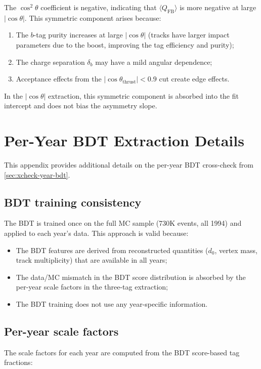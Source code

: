 \documentclass[11pt,a4paper]{article}
\begin{document}
The $\cos^2\theta$ coefficient is negative, indicating that
$\langle Q_\mathrm{FB} \rangle$ is more negative at large $|\cos\theta|$.
This symmetric component arises because:
\begin{enumerate}
\item The $b$-tag purity increases at large $|\cos\theta|$ (tracks have
  larger impact parameters due to the boost, improving the tag efficiency
  and purity);
\item The charge separation $\delta_b$ may have a mild angular dependence;
\item Acceptance effects from the $|\cos\theta_\mathrm{thrust}| < 0.9$
  cut create edge effects.
\end{enumerate}
In the $|\cos\theta|$ extraction, this symmetric component is absorbed
into the fit intercept and does not bias the asymmetry slope.

\section{Per-Year BDT Extraction Details}
\label{app:per-year-bdt}

This appendix provides additional details on the per-year BDT cross-check
from \cref{sec:xcheck-year-bdt}.

\subsection{BDT training consistency}

The BDT is trained once on the full MC sample (730K events, all 1994)
and applied to each year's data.  This approach is valid because:
\begin{itemize}
\item The BDT features are derived from reconstructed quantities ($d_0$,
  vertex mass, track multiplicity) that are available in all years;
\item The data/MC mismatch in the BDT score distribution is absorbed
  by the per-year scale factors in the three-tag extraction;
\item The BDT training does not use any year-specific information.
\end{itemize}

\subsection{Per-year scale factors}

The scale factors for each year are computed from the BDT score-based
tag fractions:
\end{document}
